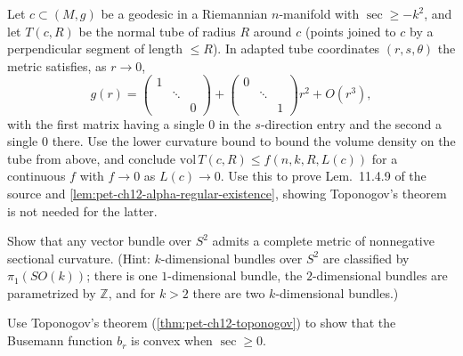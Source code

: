 \begin{remark}
  \label{rem:pet-ch12-ex-12-8-7}
  Let $c\subset(M,g)$ be a geodesic in a Riemannian $n$-manifold with
  $\sec\ge-k^2$, and let $T(c,R)$ be the normal tube of radius $R$ around $c$
  (points joined to $c$ by a perpendicular segment of length $\le R$). In
  adapted tube coordinates $(r,s,\theta)$ the metric satisfies, as $r\to0$,
  \[
    g(r)=\begin{pmatrix}1&&\\&\ddots&\\&&0\end{pmatrix}
    +\begin{pmatrix}0&&\\&\ddots&\\&&1\end{pmatrix}r^2+O(r^3),
  \]
  with the first matrix having a single $0$ in the $s$-direction entry and the
  second a single $0$ there. Use the lower curvature bound to bound the volume
  density on the tube from above, and conclude
  $\mathrm{vol}\,T(c,R)\le f(n,k,R,L(c))$ for a continuous $f$ with
  $f\to0$ as $L(c)\to0$. Use this to prove Lem.\ 11.4.9 of the source and
  \cref{lem:pet-ch12-alpha-regular-existence}, showing Toponogov's theorem is
  not needed for the latter.
\end{remark}

\begin{remark}[Exercise 12.8.8]
  \label{rem:pet-ch12-ex-12-8-8}
  Show that any vector bundle over $S^2$ admits a complete metric of
  nonnegative sectional curvature. (Hint: $k$-dimensional bundles over $S^2$
  are classified by $\pi_1(SO(k))$; there is one $1$-dimensional bundle, the
  $2$-dimensional bundles are parametrized by $\mathbb{Z}$, and for $k>2$ there
  are two $k$-dimensional bundles.)
\end{remark}

\begin{remark}[Exercise 12.8.9]
  \label{rem:pet-ch12-ex-12-8-9}
  Use Toponogov's theorem (\cref{thm:pet-ch12-toponogov}) to show that the
  Busemann function $b_r$ is convex when $\sec\ge0$.
\end{remark}

